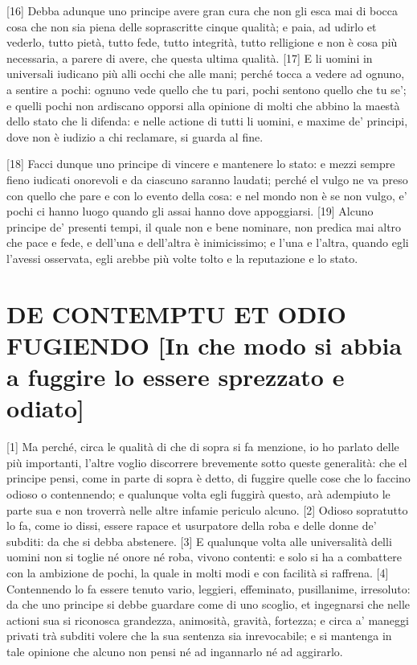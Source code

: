 {[}16{]} Debba adunque uno principe avere gran cura che non gli esca mai
di bocca cosa che non sia piena delle soprascritte cinque qualità; e
paia, ad udirlo et vederlo, tutto pietà, tutto fede, tutto integrità,
tutto relligione e non è cosa più necessaria, a parere di avere, che
questa ultima qualità. {[}17{]} E li uomini in universali iudicano più
alli occhi che alle mani; perché tocca a vedere ad ognuno, a sentire a
pochi: ognuno vede quello che tu pari, pochi sentono quello che tu se';
e quelli pochi non ardiscano opporsi alla opinione di molti che abbino
la maestà dello stato che li difenda: e nelle actione di tutti li
uomini, e maxime de' principi, dove non è iudizio a chi reclamare, si
guarda al fine.

{[}18{]} Facci dunque uno principe di vincere e mantenere lo stato: e
mezzi sempre fieno iudicati onorevoli e da ciascuno saranno laudati;
perché el vulgo ne va preso con quello che pare e con lo evento della
cosa: e nel mondo non è se non vulgo, e' pochi ci hanno luogo quando gli
assai hanno dove appoggiarsi. {[}19{]} Alcuno principe de' presenti
tempi, il quale non e bene nominare, non predica mai altro che pace e
fede, e dell'una e dell'altra è inimicissimo; e l'una e l'altra, quando
egli l'avessi osservata, egli arebbe più volte tolto e la reputazione e
lo stato.

\quebra\section{DE CONTEMPTU ET ODIO FUGIENDO
{[}In che modo si abbia a fuggire lo essere sprezzato e odiato{]}}

{[}1{]} Ma perché, circa le qualità di che di sopra si fa menzione, io
ho parlato delle più importanti, l'altre voglio discorrere brevemente
sotto queste generalità: che el principe pensi, come in parte di sopra è
detto, di fuggire quelle cose che lo faccino odioso o contennendo; e
qualunque volta egli fuggirà questo, arà adempiuto le parte sua e non
troverrà nelle altre infamie periculo alcuno. {[}2{]} Odioso sopratutto
lo fa, come io dissi, essere rapace et usurpatore della roba e delle
donne de' subditi: da che si debba abstenere. {[}3{]} E qualunque volta
alle universalità delli uomini non si toglie né onore né roba, vivono
contenti: e solo si ha a combattere con la ambizione de pochi, la quale
in molti modi e con facilità si raffrena. {[}4{]} Contennendo lo fa
essere tenuto vario, leggieri, effeminato, pusillanime, irresoluto: da
che uno principe si debbe guardare come di uno scoglio, et ingegnarsi
che nelle actioni sua si riconosca grandezza, animosità, gravità,
fortezza; e circa a' maneggi privati trà subditi volere che la sua
sentenza sia inrevocabile; e si mantenga in tale opinione che alcuno non
pensi né ad ingannarlo né ad aggirarlo.

